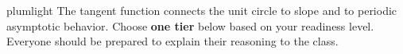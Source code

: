 \documentclass[10pt]{article}
\begin{document}
\namepartnerperiod

\vspace{0.08in}

\begin{scenariobox}{plumlight}
The tangent function connects the unit circle to slope and to periodic asymptotic
behavior.  Choose \textbf{one tier} below based on your readiness level.
Everyone should be prepared to explain their reasoning to the class.
\end{scenariobox}

\vspace{0.06in}

\end{document}
